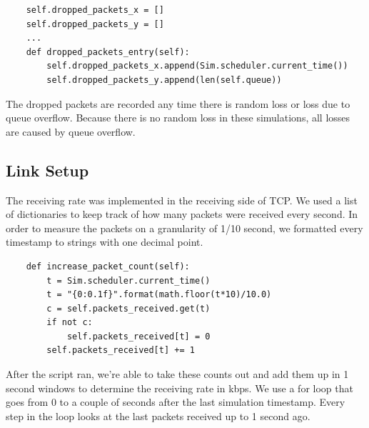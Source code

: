 \documentclass[11pt]{article}
\begin{document}
\vspace{5mm}

\begin{lstlisting}
    self.dropped_packets_x = []
    self.dropped_packets_y = []
    ...
    def dropped_packets_entry(self):
        self.dropped_packets_x.append(Sim.scheduler.current_time())
        self.dropped_packets_y.append(len(self.queue))
\end{lstlisting}

\vspace{5mm}

The dropped packets are recorded any time there is random loss or loss due to queue overflow. Because there is no random loss in these simulations, all losses are caused by queue overflow.

\subsection{Link Setup}

The receiving rate was implemented in the receiving side of TCP. We used a list of dictionaries to keep track of how many packets were received every second. In order to measure the packets on a granularity of 1/10 second, we formatted every timestamp to strings with one decimal point. 

\vspace{5mm}

\begin{lstlisting}
    def increase_packet_count(self):
        t = Sim.scheduler.current_time()
        t = "{0:0.1f}".format(math.floor(t*10)/10.0)
        c = self.packets_received.get(t)
        if not c:
            self.packets_received[t] = 0
        self.packets_received[t] += 1
\end{lstlisting}

\vspace{5mm}

After the script ran, we're able to take these counts out and add them up in 1 second windows to determine the receiving rate in kbps. We use a for loop that goes from 0 to a couple of seconds after the last simulation timestamp. Every step in the loop looks at the last packets received up to 1 second ago.

\vspace{5mm}
\end{document}
